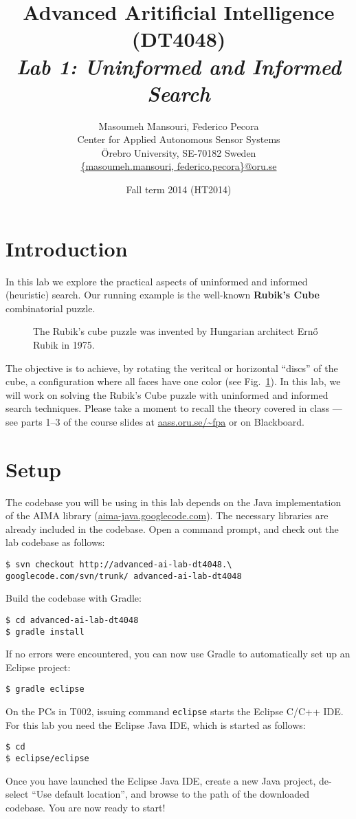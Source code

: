\documentclass[a4paper]{article}
\title{Advanced Aritificial Intelligence (DT4048)\\{\em Lab 1: Uninformed and Informed Search}}
\author{Masoumeh Mansouri, Federico Pecora\\Center for Applied Autonomous Sensor Systems\\\"Orebro University, SE-70182 Sweden\\\url{{masoumeh.mansouri, federico.pecora}@oru.se}}
\date{Fall term 2014 (HT2014)}
\begin{document}
\maketitle

\section{Introduction}

In this lab we explore the practical aspects of uninformed and informed (heuristic) search.  Our running example is the well-known {\bf Rubik's Cube} combinatorial puzzle.
\begin{figure}[!ht]
\centering

\caption{{\small The Rubik's cube puzzle was invented by Hungarian architect Ern\H{o} Rubik in 1975.}}
\label{fig:rc}
\end{figure}
The objective is to achieve, by rotating the veritcal or horizontal ``discs'' of the cube, a configuration where all faces have one color (see Fig.~\ref{fig:rc}).  In this lab, we will work on solving the Rubik's Cube puzzle with uninformed and informed search techniques.  Please take a moment to recall the theory covered in class --- see parts 1--3 of the course slides at \url{aass.oru.se/~fpa} or on Blackboard.

\section{Setup}
The codebase you will be using in this lab depends on the Java implementation of the AIMA library (\url{aima-java.googlecode.com}).  The necessary libraries are already included in the codebase.
Open a command prompt, and check out the lab codebase as follows:
\begin{lstlisting}
$ svn checkout http://advanced-ai-lab-dt4048.\
googlecode.com/svn/trunk/ advanced-ai-lab-dt4048
\end{lstlisting}
Build the codebase with Gradle:
\begin{lstlisting}
$ cd advanced-ai-lab-dt4048
$ gradle install
\end{lstlisting}
If no errors were encountered, you can now use Gradle to automatically set up an Eclipse project:
\begin{lstlisting}
$ gradle eclipse
\end{lstlisting}
On the PCs in T002, issuing command {\tt eclipse} starts the Eclipse C/C++ IDE.  For this lab you need the Eclipse Java IDE, which is started as follows:
\begin{lstlisting}
$ cd
$ eclipse/eclipse
\end{lstlisting}
Once you have launched the Eclipse Java IDE, create a new Java project, de-select ``Use default location'', and browse to the path of the downloaded codebase. You are now ready to start!
\end{document}
